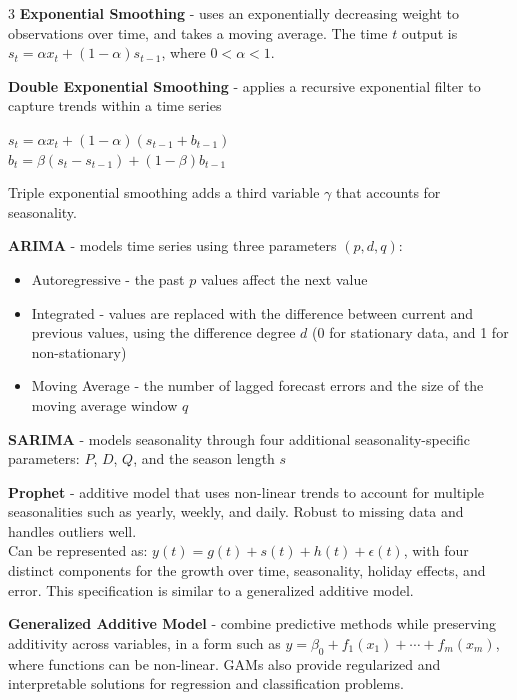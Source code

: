 \documentclass[10pt,landscape,letterpaper]{article}
\begin{document}
\begin{multicols}{3}
\textbf{Exponential Smoothing} - uses an exponentially decreasing weight to observations over time, and takes a moving average. The time $t$ output is $s_t = \alpha x_t + (1-\alpha)s_{t-1}$, where  $0 < \alpha < 1$.
\smallskip

\textbf{Double Exponential Smoothing} - applies a recursive exponential filter to capture trends within a time series
    \begin{center}
    \vspace{-2.5mm}
    $s_t = \alpha x_t + (1-\alpha)(s_{t-1} + b_{t-1})$\\
    $b_t = \beta (s_t - s_{t-1}) + (1-\beta)b_{t-1}$\\
    \vspace{-2mm}
    \end{center}
Triple exponential smoothing adds a third variable
$\gamma$ that accounts for seasonality.
\smallskip

\textbf{ARIMA} - models time series using three parameters $(p,d,q)$:
\begin{itemize}[label={--},leftmargin=4mm]
\itemsep -.4mm
\item Autoregressive - the past $p$ values affect the next value

\item Integrated - values are replaced with the difference between current and previous values, using the difference degree $d$ (0 for stationary data, and 1 for non-stationary)

\item Moving Average - the number of lagged forecast errors and the size of the moving average window $q$
\end{itemize}

\textbf{SARIMA} - models seasonality through four additional seasonality-specific parameters: $P$, $D$, $Q$, and the season length $s$
\smallskip

\textbf{Prophet} - additive model that uses non-linear trends to account for multiple seasonalities such as yearly, weekly, and daily. Robust to missing data and handles outliers well.\\ Can be represented as: $y(t) = g(t) + s(t) + h(t) + \epsilon(t)$, with four distinct components for the growth over time, seasonality, holiday effects, and error. This specification is similar to a generalized additive model.
\smallskip

\textbf{Generalized Additive Model} - combine predictive methods while preserving additivity across variables, in a form such as
$y = \beta_0 + f_1(x_1) + \cdots + f_m(x_m)$, where functions can be non-linear. GAMs also provide regularized and interpretable solutions for regression and classification problems.


\end{multicols}
\end{document}
